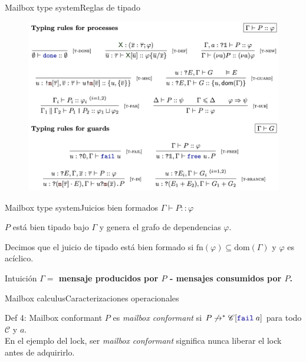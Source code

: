 \documentclass{beamer}
\newcommand{\fail}[1]{\texttt{\textcolor{keyword}{fail}}\hspace{0.25em}#1}
\begin{document}
\begin{frame}{Mailbox type system}{Reglas de tipado}
    \begin{figure}[H]
        \includegraphics[width=\textwidth]{typing-rules}
    \end{figure}
\end{frame}

\begin{frame}{Mailbox type system}{Juicios bien formados}
    $\Gamma \vdash P :: \varphi$
    \vspace{1em}

    $P$ está bien tipado bajo $\Gamma$ y genera el grafo de dependencias $\varphi$.
    \vspace{1em}

    Decimos que el juicio de tipado está bien formado si $\text{fn}(\varphi) \subseteq \text{dom}(\Gamma)$ y $\varphi$ es acíclico.
    \vspace{1em}

    \begin{block}{Intuición}
        \textbf{$\Gamma =$ mensaje producidos por $P$ - mensajes consumidos por $P$.}
    \end{block}
\end{frame}

\begin{frame}{Mailbox calculus}{Caracterizaciones operacionales}
    \begin{block}{Def 4: Mailbox conformant}
        $P$ es \emph{mailbox conformant} si $P \not\rightarrow^\ast \mathscr{C}[\fail{a}]$ para todo $\mathscr{C}$ y $a$.
        \\
        En el ejemplo del lock, ser \emph{mailbox conformant} significa nunca liberar el lock antes de adquirirlo.
    \end{block}
\end{frame}
\end{document}

